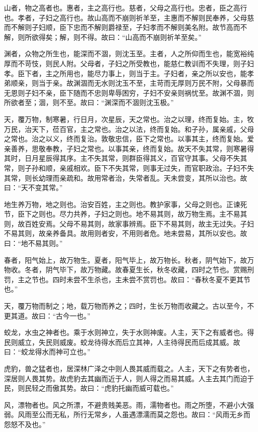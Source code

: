 \documentclass[]{article}
\begin{document}
山者，物之高者也。惠者，主之高行也。慈者，父母之高行也。忠者，臣之高行也。孝者，子妇之高行也。故山高而不崩则祈羊至，主惠而不解则民奉养，父母慈而不解则子妇顺，臣下忠而不解则爵禄至，子妇孝而不解则美名附。故节高而不解，则所欲得矣；解，则不得。故曰：``山高而不崩则祈羊至矣。''

渊者，众物之所生也，能深而不涸，则沈玉至。主者，人之所仰而生也，能宽裕纯厚而不苛忮，则民人附。父母者，子妇之所受教也，能慈仁教训而不失理，则子妇孝。臣下者，主之所用也，能尽力事上，则当于主。子妇者，亲之所以安也，能孝弟顺亲，则当于亲。故渊涸而无水则沈玉不至，主苛而无厚则万民不附，父母暴而无恩则子妇不亲，臣下随而不忠则卑辱困穷，子妇不安亲则祸忧至。故渊不涸，则所欲者至；涸，则不至。故曰：``渊深而不涸则沈玉极。''

天，覆万物，制寒暑，行日月，次星辰，天之常也。治之以理，终而复始。主，牧万民，治天下，莅百官，主之常也。治之以法，终而复始。和子孙，属亲戚，父母之常也。治之以义，终而复治。敦敬忠信，臣下之常也。以事其主，终而复始。爱亲善养，思敬奉教，子妇之常也。以事其亲，终而复始。故天不失其常，则寒暑得其时，日月星辰得其序。主不失其常，则群臣得其义，百官守其事。父母不失其常，则子孙和顺，亲戚相欢。臣下不失其常，则事无过失，而官职政治。子妇不失其常，则长幼理而亲疏和。故用常者治，失常者乱。天未尝变，其所以治也。故曰：``天不变其常。''

地生养万物，地之则也。治安百姓，主之则也。教护家事，父母之则也。正谏死节，臣下之则也。尽力共养，子妇之则也。地不易其则，故万物生焉。主不易其则，故百姓安焉。父母不易其则，故家事辨焉。臣下不易其则，故主无过失。子妇不易其则，故亲养备具。故用则者安，不用则者危。地未尝易，其所以安也。故曰：``地不易其则。''

春者，阳气始上，故万物生。夏者，阳气毕上，故万物长。秋者，阴气始下，故万物收。冬者，阴气毕下，故万物藏。故春夏生长，秋冬收藏，四时之节也。赏赐刑罚，主之节也。四时未尝不生杀也，主未尝不赏罚也。故曰：``春秋冬夏不更其节也。''

天，覆万物而制之；地，载万物而养之；四时，生长万物而收藏之。古以至今，不更其道。故曰：``古今一也。''

蛟龙，水虫之神者也。乘于水则神立，失于水则神废。人主，天下之有威者也。得民则威立，失民则威废。蛟龙待得水而后立其神，人主待得民而后成其威。故曰：``蛟龙得水而神可立也。''

虎豹，兽之猛者也，居深林广泽之中则人畏其威而载之。人主，天下之有势者也，深居则人畏其势。故虎豹去其幽而近于人，则人得之而易其威。人主去其门而迫于民，则民轻之而傲其势。故曰：``虎豹托幽而威可载也。''

风，漂物者也。风之所漂，不避贵贱美恶。雨，濡物者也。雨之所堕，不避小大强弱。风雨至公而无私，所行无常乡，人虽遇漂濡而莫之怨也。故曰：``风雨无乡而怨怒不及也。''
\end{document}

